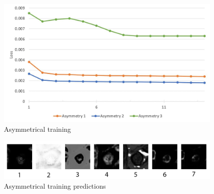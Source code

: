 \begin{figure}[H]
	\begin{center}
		\includegraphics[width=0.5\linewidth]{bilder/golgi/asymmetrical-training.jpg}
		\caption{Asymmetrical training}\label{fig:golgi-asymmetrical-training}
	\end{center}
\end{figure}

\begin{figure}[H]
	\begin{center}
		\includegraphics[width=\linewidth]{bilder/golgi/asymmetrical-predictions.png}
		\caption{Asymmetrical training predictions}\label{fig:golgi-asymmetrical-predictions}
	\end{center}
\end{figure}